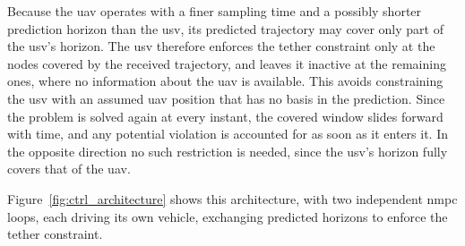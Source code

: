 Because the \gls{uav} operates with a finer sampling time and a possibly shorter prediction horizon than the \gls{usv}, its predicted trajectory may cover only part of the \gls{usv}'s horizon. The \gls{usv} therefore enforces the tether constraint only at the nodes covered by the received trajectory, and leaves it inactive at the remaining ones, where no information about the \gls{uav} is available. This avoids constraining the \gls{usv} with an assumed \gls{uav} position that has no basis in the prediction. Since the problem is solved again at every instant, the covered window slides forward with time, and any potential violation is accounted for as soon as it enters it. In the opposite direction no such restriction is needed, since the \gls{usv}'s horizon fully covers that of the \gls{uav}.

Figure~\ref{fig:ctrl_architecture} shows this architecture, with two independent \gls{nmpc} loops, each driving its own vehicle, exchanging predicted horizons to enforce the tether constraint.

